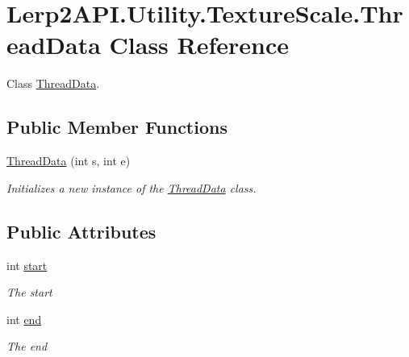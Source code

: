 \hypertarget{class_lerp2_a_p_i_1_1_utility_1_1_texture_scale_1_1_thread_data}{}\section{Lerp2\+A\+P\+I.\+Utility.\+Texture\+Scale.\+Thread\+Data Class Reference}
\label{class_lerp2_a_p_i_1_1_utility_1_1_texture_scale_1_1_thread_data}


Class \hyperlink{class_lerp2_a_p_i_1_1_utility_1_1_texture_scale_1_1_thread_data}{Thread\+Data}.  


\subsection*{Public Member Functions}
\begin{DoxyCompactItemize}
\item 
\hyperlink{class_lerp2_a_p_i_1_1_utility_1_1_texture_scale_1_1_thread_data_acec0feaaceba3a9ed76b0d1e9b4de587}{Thread\+Data} (int s, int e)
\begin{DoxyCompactList}\small\item\em Initializes a new instance of the \hyperlink{class_lerp2_a_p_i_1_1_utility_1_1_texture_scale_1_1_thread_data}{Thread\+Data} class. \end{DoxyCompactList}\end{DoxyCompactItemize}
\subsection*{Public Attributes}
\begin{DoxyCompactItemize}
\item 
int \hyperlink{class_lerp2_a_p_i_1_1_utility_1_1_texture_scale_1_1_thread_data_ad328b15a0f0466dbcb2d292159a1cb26}{start}
\begin{DoxyCompactList}\small\item\em The start \end{DoxyCompactList}\item 
int \hyperlink{class_lerp2_a_p_i_1_1_utility_1_1_texture_scale_1_1_thread_data_a12ae3b2c893805120621dafee96dafbd}{end}
\begin{DoxyCompactList}\small\item\em The end \end{DoxyCompactList}\end{DoxyCompactItemize}


